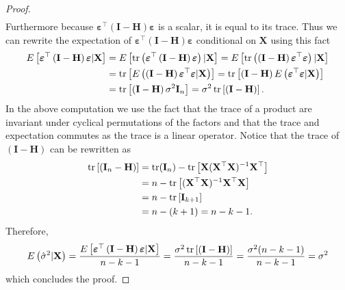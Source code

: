 \begin{proof}
\begin{align*}
    \end{align*}
    Furthermore because $\boldsymbol{\varepsilon}^\top \left(\mathbf{I} - \mathbf{H}\right)\boldsymbol{\varepsilon}$ is a scalar, it is equal to its trace.
    Thus we can rewrite the expectation of $\boldsymbol{\varepsilon}^\top \left(\mathbf{I} - \mathbf{H}\right)\boldsymbol{\varepsilon}$ conditional on $\mathbf{X}$ using this fact
    \begin{align}
        E\left[\boldsymbol{\varepsilon}^\top \left(\mathbf{I} - \mathbf{H}\right)\boldsymbol{\varepsilon}|\mathbf{X}\right] &= E\left[\operatorname{\text{tr}}\left(\boldsymbol{\varepsilon}^\top \left(\mathbf{I} - \mathbf{H}\right)\boldsymbol{\varepsilon}\right)|\mathbf{X}\right] 
        = E\left[\operatorname{\text{tr}}\left(\left(\mathbf{I} - \mathbf{H}\right)\boldsymbol{\varepsilon}^\top\boldsymbol{\varepsilon}\right)|\mathbf{X}\right] \nonumber\\
        &= \operatorname{\text{tr}}\left[E\left(\left(\mathbf{I} - \mathbf{H}\right)\boldsymbol{\varepsilon}^\top\boldsymbol{\varepsilon}|\mathbf{X}\right)\right] 
        = \operatorname{\text{tr}}\left[\left(\mathbf{I} - \mathbf{H}\right)E\left(\boldsymbol{\varepsilon}^\top\boldsymbol{\varepsilon}|\mathbf{X}\right)\right] \nonumber\\
        &= \operatorname{\text{tr}}\left[\left(\mathbf{I} - \mathbf{H}\right)\sigma^2\mathbf{I}_{n}\right]
        = \sigma^2\operatorname{\text{tr}}\left[\left(\mathbf{I} - \mathbf{H}\right)\right]. \label{eq:trace_projection_matrix}
    \end{align}
    In the above computation we use the fact that the trace of a product are invariant under cyclical permutations of the factors and that the trace and expectation commutes as the trace is a linear operator. 
    Notice that the trace of $\left(\mathbf{I} - \mathbf{H}\right)$ can be rewritten as
    \begin{align*}
        \operatorname{\text{tr}}\left[\left(\mathbf{I}_n - \mathbf{H}\right)\right] &= \operatorname{\text{tr}}(\mathbf{I}_n) - \operatorname{\text{tr}}\left[\mathbf{X}(\mathbf{X}^\top\mathbf{X})^{-1}\mathbf{X}^\top\right] \\
        &= n - \operatorname{\text{tr}}\left[ (\mathbf{X}^\top\mathbf{X})^{-1}\mathbf{X}^\top\mathbf{X} \right] \\
         &= n - \operatorname{\text{tr}}\left[\mathbf{I}_{k + 1} \right] \\
        &= n - (k + 1) = n - k - 1.
    \end{align*}
    Therefore,
    \begin{align*}
        E\left(\hat{\sigma}^2|\mathbf{X}\right) = \frac{ E\left[\boldsymbol{\varepsilon}^\top \left(\mathbf{I} - \mathbf{H}\right)\boldsymbol{\varepsilon}|\mathbf{X}\right]}{n - k - 1} = \frac{\sigma^2\operatorname{\text{tr}}\left[\left(\mathbf{I} - \mathbf{H}\right)\right]}{n - k - 1} = \frac{\sigma^2(n - k - 1)}{n - k - 1} = \sigma^2
    \end{align*}
    which concludes the proof.
\end{proof}
